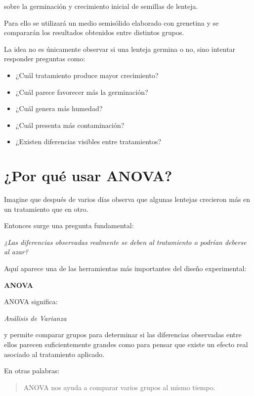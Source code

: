sobre la germinación y crecimiento inicial de semillas de lenteja.

Para ello se utilizará un medio semisólido elaborado con grenetina y se compararán los resultados obtenidos entre distintos grupos.

La idea no es únicamente observar si una lenteja germina o no, sino intentar responder preguntas como:

\begin{itemize}
\item ¿Cuál tratamiento produce mayor crecimiento?
\item ¿Cuál parece favorecer más la germinación?
\item ¿Cuál genera más humedad?
\item ¿Cuál presenta más contaminación?
\item ¿Existen diferencias visibles entre tratamientos?
\end{itemize}

\section{¿Por qué usar ANOVA?}

Imagine que después de varios días observa que algunas lentejas crecieron más en un tratamiento que en otro.

Entonces surge una pregunta fundamental:

\begin{center}
\textit{¿Las diferencias observadas realmente se deben al tratamiento o podrían deberse al azar?}
\end{center}

Aquí aparece una de las herramientas más importantes del diseño experimental:

\begin{center}
\textbf{ANOVA}
\end{center}

ANOVA significa:

\begin{center}
\textit{Análisis de Varianza}
\end{center}

y permite comparar grupos para determinar si las diferencias observadas entre ellos parecen suficientemente grandes como para pensar que existe un efecto real asociado al tratamiento aplicado.

En otras palabras:

\begin{quote}
ANOVA nos ayuda a comparar varios grupos al mismo tiempo.
\end{quote}

